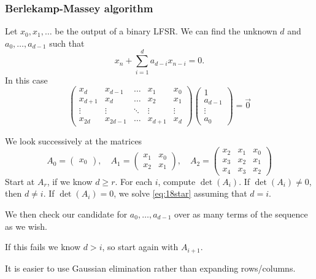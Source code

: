 \documentclass{article}
\newcommand{\1}[1]{\mathbbm{1}_{#1}}
\begin{document}
\subsubsection*{Berlekamp-Massey algorithm}
Let $x_0, x_1, \dotsc$ be the output of a binary LFSR.
We can find the unknown $d$ and $a_0, \dotsc, a_{d-1}$ such that
\begin{equation*}
    x_n + \sum_{i=1}^d a_{d-i} x_{n-i} = 0.
\end{equation*}
In this case
\begin{equation*}
    \begin{pmatrix}
        x_d & x_{d-1} & \dots & x_1 & x_0 \\
        x_{d+1} & x_d & \dots & x_2 & x_1 \\
        \vdots & \vdots & \ddots & \vdots & \vdots \\
        x_{2d} & x_{2d-1} & \dots & x_{d+1} & x_d
    \end{pmatrix}
    \begin{pmatrix}
        1 \\ a_{d-1} \\ \vdots \\ a_0
    \end{pmatrix}
    = \vec{0} \label{eq:18star} \tag{$*$}
\end{equation*}

We look successively at the matrices
\begin{equation*}
    A_0 =
    \begin{pmatrix}
        x_0
    \end{pmatrix}, \quad
    A_1 =
    \begin{pmatrix}
        x_1 & x_0 \\ x_2 & x_1
    \end{pmatrix}, \quad
    A_2 =
    \begin{pmatrix}
        x_2 & x_1 & x_0 \\
        x_3 & x_2 & x_1 \\
        x_4 & x_3 & x_2
    \end{pmatrix}
\end{equation*}
Start at $A_r$, if we know $d \geq r$.
For each $i$, compute $\det(A_i)$.  If $\det(A_i) \neq 0$, then $d \neq i$.
If $\det(A_i) = 0$, we solve \eqref{eq:18star} assuming that $d=i$.

We then check our candidate for $a_0, \dotsc, a_{d-1}$ over as many terms of the sequence as we wish.

If this fails we know $d > i$, so start again with $A_{i+1}$.
\begin{remark}
    It is easier to use Gaussian elimination rather than expanding rows/columns.
\end{remark}
\end{document}
